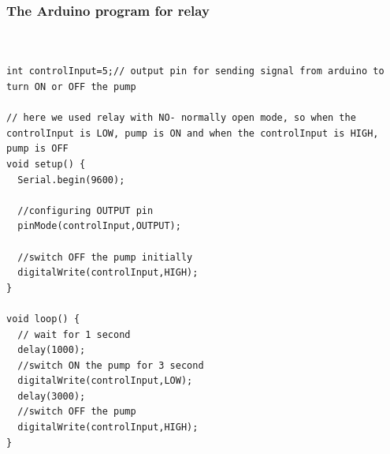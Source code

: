 \documentclass[12pt]{article}
\begin{document}
\subsubsection*{The Arduino program for relay}
\begin{lstlisting}[style=Cstyle]


int controlInput=5;// output pin for sending signal from arduino to turn ON or OFF the pump

// here we used relay with NO- normally open mode, so when the controlInput is LOW, pump is ON and when the controlInput is HIGH, pump is OFF
void setup() {
  Serial.begin(9600);

  //configuring OUTPUT pin
  pinMode(controlInput,OUTPUT);

  //switch OFF the pump initially
  digitalWrite(controlInput,HIGH);
}

void loop() {
  // wait for 1 second
  delay(1000);
  //switch ON the pump for 3 second
  digitalWrite(controlInput,LOW);
  delay(3000);
  //switch OFF the pump 
  digitalWrite(controlInput,HIGH);
}
\end{lstlisting}
\end{document}
